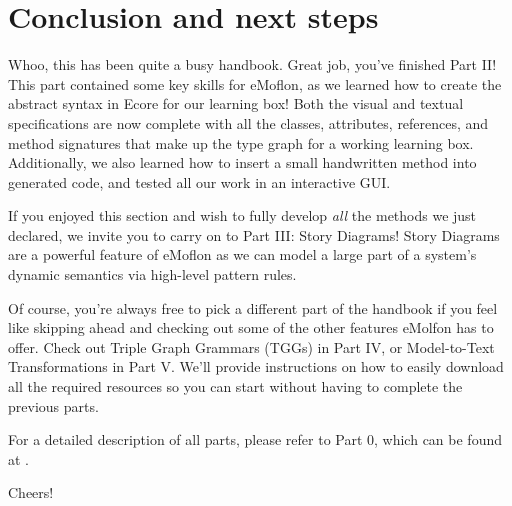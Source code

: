\newpage
\section{Conclusion and next steps}
\genHeader
\hypertarget{conclusion}{}

\vspace{0.5cm}

Whoo, this has been quite a busy handbook. Great job, you've finished Part II! This part contained some key skills for eMoflon, as we learned how to create
the abstract syntax in Ecore for our learning box! Both the visual and textual specifications are now complete with all the classes, attributes, references, and
method signatures that make up the type graph for a working learning box. Additionally, we also learned how to insert a small handwritten method into generated
code, and tested all our work in an interactive GUI.

If you enjoyed this section and wish to fully develop \emph{all} the methods we just declared, we invite you to carry on to Part III: Story
Diagrams! Story Diagrams are a powerful feature of eMoflon as we can model a large part of a system's dynamic semantics via high-level pattern rules. 


Of course, you're always free to pick a different part of the handbook if you feel like skipping ahead and checking out some of the other features eMolfon has
to offer. Check out Triple Graph Grammars (TGGs)  in Part IV, or Model-to-Text Transformations in Part V. We'll provide instructions on how to easily download
all the required resources so you can start without having to complete the previous parts.

For a detailed description of all parts, please refer to Part 0, which can be found at \dlPartZero.

\vspace{1.0cm}

Cheers!